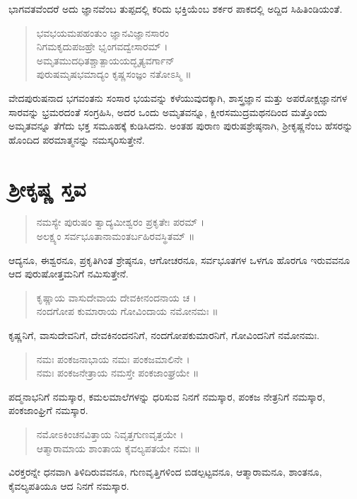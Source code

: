 ಭಾಗವತವೆಂದರೆ ಅದು ಜ್ಞಾನವೆಂಬ ತುಪ್ಪದಲ್ಲಿ ಕರಿದು ಭಕ್ತಿಯೆಂಬ ಶರ್ಕರ ಪಾಕದಲ್ಲಿ ಅದ್ದಿದ ಸಿಹಿತಿಂಡಿಯಂತೆ.

\begin{verse}
ಭವಭಯಮಪಹಂತುಂ ಜ್ಞಾನವಿಜ್ಞಾನಸಾರಂ\\ನಿಗಮಕೃದುಪಜಹ್ರೇ ಭೃಂಗವದ್ವೇಸಾರಮ್ ।\\ಅಮೃತಮುದಧಿತಶ್ಚಾತ್ಪಾಯಯದ್ಭೃತ್ಯವರ್ಗಾನ್​\\ಪುರುಷಮೃಷಭಮಾದ್ಯಂ ಕೃಷ್ಣಸಂಜ್ಞಂ ನತೋಽಸ್ಮಿ ॥
\end{verse}

ವೇದಪುರುಷನಾದ ಭಗವಂತನು ಸಂಸಾರ ಭಯವನ್ನು ಕಳೆಯುವುದಕ್ಕಾಗಿ, ಶಾಸ್ತ್ರಜ್ಞಾನ ಮತ್ತು ಅಪರೋಕ್ಷಜ್ಞಾನಗಳ ಸಾರವನ್ನು ಭ್ರಮರದಂತೆ ಸಂಗ್ರಹಿಸಿ, ಅದರ ಒಂದು ಅಮೃತವನ್ನೂ, ಕ್ಷೀರಸಮುದ್ರಮಥನದಿಂದ ಮತ್ತೊಂದು ಅಮೃತವನ್ನೂ ತೆಗೆದು ಭಕ್ತ ಸಮೂಹಕ್ಕೆ ಕುಡಿಸಿದನು. ಅಂತಹ ಪುರಾಣ ಪುರುಷಶ್ರೇಷ್ಠನಾಗಿ, ಶ್ರೀಕೃಷ್ಣನೆಂಬ ಹೆಸರನ್ನು ಹೊಂದಿದ ಪರಮಾತ್ಮನನ್ನು ನಮಸ್ಕರಿಸುತ್ತೇನೆ.

\chapter*{ಶ್ರೀಕೃಷ್ಣ ಸ್ತವ}

\begin{verse}
ನಮಸ್ಯೇ ಪುರುಷಂ ತ್ವಾದ್ಯಮೀಶ್ವರಂ ಪ್ರಕೃತೇಃ ಪರಮ್ ।\\ಅಲಕ್ಷ್ಯಂ ಸರ್ವಭೂತಾನಾಮಂತರ್ಬಹಿರವಸ್ಥಿತಮ್ ॥
\end{verse}

ಆದ್ಯನೂ, ಈಶ್ವರನೂ, ಪ್ರಕೃತಿಗಿಂತ ಶ್ರೇಷ್ಠನೂ, ಆಗೋಚರನೂ, ಸರ್ವಭೂತಗಳ ಒಳಗೂ ಹೊರಗೂ ಇರುವವನೂ ಆದ ಪುರುಷೋತ್ತಮನಿಗೆ ನಮಿಸುತ್ತೇನೆ.

\begin{verse}
ಕೃಷ್ಣಾಯ ವಾಸುದೇವಾಯ ದೇವಕೀನಂದನಾಯ ಚ ।\\ನಂದಗೋಪ ಕುಮಾರಾಯ ಗೋವಿಂದಾಯ ನಮೋನಮಃ ॥
\end{verse}

ಕೃಷ್ಣನಿಗೆ, ವಾಸುದೇವನಿಗೆ, ದೇವಕಿನಂದನನಿಗೆ, ನಂದಗೋಪಕುಮಾರನಿಗೆ, ಗೋವಿಂದನಿಗೆ ನಮೋನಮಃ.

\begin{verse}
ನಮಃ ಪಂಕಜನಾಭಾಯ ನಮಃ ಪಂಕಜಮಾಲಿನೇ ।\\ನಮಃ ಪಂಕಜನೇತ್ರಾಯ ನಮಸ್ತೇ ಪಂಕಜಾಂಘ್ರಯೇ ॥
\end{verse}

ಪದ್ಮನಾಭನಿಗೆ ನಮಸ್ಕಾರ, ಕಮಲಮಾಲೆಗಳನ್ನು ಧರಿಸುವ ನಿನಗೆ ನಮಸ್ಕಾರ, ಪಂಕಜ ನೇತ್ರನಿಗೆ ನಮಸ್ಕಾರ, ಪಂಕಜಾಂಘ್ರಿಗೆ ನಮಸ್ಕಾರ.

\begin{verse}
ನಮೋಽಕಿಂಚನವಿತ್ತಾಯ ನಿವೃತ್ತಗುಣವೃತ್ತಯೇ ।\\ಆತ್ಮಾರಾಮಾಯ ಶಾಂತಾಯ ಕೈವಲ್ಯಪತಯೇ ನಮಃ ॥
\end{verse}

ವಿರಕ್ತರನ್ನೇ ಧನವಾಗಿ ತಿಳಿದಿರುವವನೂ, ಗುಣವೃತ್ತಿಗಳಿಂದ ಬಿಡಲ್ಪಟ್ಟವನೂ, ಆತ್ಮಾರಾಮನೂ, ಶಾಂತನೂ, ಕೈವಲ್ಯಪತಿಯೂ ಆದ ನಿನಗೆ ನಮಸ್ಕಾರ.

